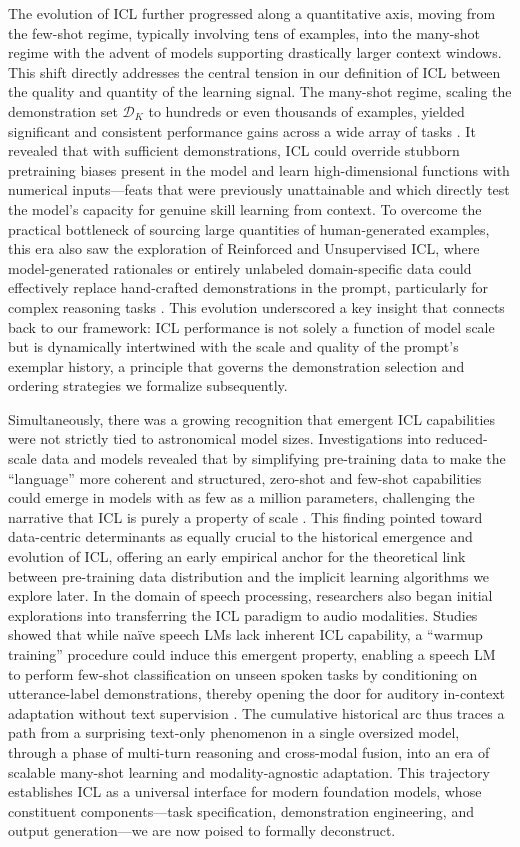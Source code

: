 \documentclass[11pt]{article}
\begin{document}
The evolution of ICL further progressed along a quantitative axis, moving from the few-shot regime, typically involving tens of examples, into the many-shot regime with the advent of models supporting drastically larger context windows. This shift directly addresses the central tension in our definition of ICL between the quality and quantity of the learning signal. The many-shot regime, scaling the demonstration set \(\mathcal{D}_K\) to hundreds or even thousands of examples, yielded significant and consistent performance gains across a wide array of tasks \cite{ref15}. It revealed that with sufficient demonstrations, ICL could override stubborn pretraining biases present in the model and learn high-dimensional functions with numerical inputs---feats that were previously unattainable and which directly test the model's capacity for genuine skill learning from context. To overcome the practical bottleneck of sourcing large quantities of human-generated examples, this era also saw the exploration of Reinforced and Unsupervised ICL, where model-generated rationales or entirely unlabeled domain-specific data could effectively replace hand-crafted demonstrations in the prompt, particularly for complex reasoning tasks \cite{ref15}. This evolution underscored a key insight that connects back to our framework: ICL performance is not solely a function of model scale but is dynamically intertwined with the scale and quality of the prompt's exemplar history, a principle that governs the demonstration selection and ordering strategies we formalize subsequently.

Simultaneously, there was a growing recognition that emergent ICL capabilities were not strictly tied to astronomical model sizes. Investigations into reduced-scale data and models revealed that by simplifying pre-training data to make the ``language'' more coherent and structured, zero-shot and few-shot capabilities could emerge in models with as few as a million parameters, challenging the narrative that ICL is purely a property of scale \cite{ref16}. This finding pointed toward data-centric determinants as equally crucial to the historical emergence and evolution of ICL, offering an early empirical anchor for the theoretical link between pre-training data distribution and the implicit learning algorithms we explore later. In the domain of speech processing, researchers also began initial explorations into transferring the ICL paradigm to audio modalities. Studies showed that while naïve speech LMs lack inherent ICL capability, a ``warmup training'' procedure could induce this emergent property, enabling a speech LM to perform few-shot classification on unseen spoken tasks by conditioning on utterance-label demonstrations, thereby opening the door for auditory in-context adaptation without text supervision \cite{ref17}. The cumulative historical arc thus traces a path from a surprising text-only phenomenon in a single oversized model, through a phase of multi-turn reasoning and cross-modal fusion, into an era of scalable many-shot learning and modality-agnostic adaptation. This trajectory establishes ICL as a universal interface for modern foundation models, whose constituent components---task specification, demonstration engineering, and output generation---we are now poised to formally deconstruct.
\end{document}
